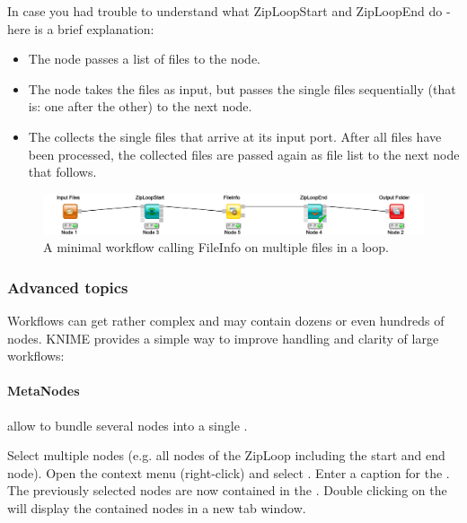 In case you had trouble to understand what ZipLoopStart and ZipLoopEnd do - here is a brief explanation:
\begin{itemize}
\item
The   node passes a list of files to the  node.
\item
The  node takes the files as input, but passes the single files sequentially (that is: one after the other) to the next node. 
\item
The  collects the single files that arrive at its input port. After all files have been processed, the collected files are passed again as file list to the next node that follows.
\end{itemize}

\begin{figure}
\centering
\includegraphics[width=\textwidth]{graphics/knime_setup/Minimal_FileInfoLoop}
\caption{A minimal workflow calling FileInfo on multiple files in a loop.}
\label{fig:knime_minimal_loop}
\end{figure}

\subsubsection{Advanced topics}

Workflows can get rather complex and may contain dozens or even hundreds of nodes. KNIME provides a simple way to improve handling and clarity of large workflows:

\paragraph{MetaNodes} allow to bundle several nodes into a single .

\begin{task}
Select multiple nodes (e.g. all nodes of the ZipLoop including the start and end node). Open the context menu (right-click) and select . Enter a caption for the . The previously selected nodes are now contained in the . Double clicking on the  will display the contained nodes in a new tab window. 
\end{task}

